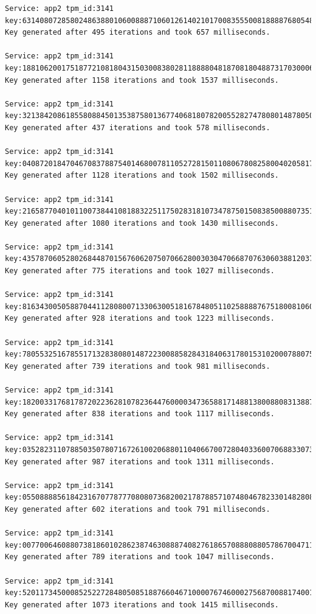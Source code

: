 \begin{lstlisting}
Service: app2 tpm_id:3141 key:631408072858024863880106008887106012614021017008355500818888768054831008
Key generated after 495 iterations and took 657 milliseconds.

Service: app2 tpm_id:3141 key:188106200175187721081804315030083802811888804818708180488731703000680486
Key generated after 1158 iterations and took 1537 milliseconds.

Service: app2 tpm_id:3141 key:321384208618558088450135387580136774068180782005528274780801487805081678
Key generated after 437 iterations and took 578 milliseconds.

Service: app2 tpm_id:3141 key:040872018470467083788754014680078110527281501108067808258004020581700676
Key generated after 1128 iterations and took 1502 milliseconds.

Service: app2 tpm_id:3141 key:216587704010110073844108188322511750283181073478750150838500880735130815
Key generated after 1080 iterations and took 1430 milliseconds.

Service: app2 tpm_id:3141 key:435787060528026844870156760620750706628003030470668707630603881203760721
Key generated after 775 iterations and took 1027 milliseconds.

Service: app2 tpm_id:3141 key:816343005058870441128080071330630051816784805110258888767518008106028167
Key generated after 928 iterations and took 1223 milliseconds.

Service: app2 tpm_id:3141 key:780553251678551713283808014872230088582843184063178015310200078807535328
Key generated after 739 iterations and took 981 milliseconds.

Service: app2 tpm_id:3141 key:182003317681787202236281078236447600003473658817148813800880831388703710
Key generated after 838 iterations and took 1117 milliseconds.

Service: app2 tpm_id:3141 key:035282311078850350780716726100206880110406670072804033600706883307330172
Key generated after 987 iterations and took 1311 milliseconds.

Service: app2 tpm_id:3141 key:055088885618423167077877708080736820021787885710748046782330148280804038
Key generated after 602 iterations and took 791 milliseconds.

Service: app2 tpm_id:3141 key:007700646088073818601028623874630888740827618657088808805786700471168025
Key generated after 789 iterations and took 1047 milliseconds.

Service: app2 tpm_id:3141 key:520117345000852522728480508518876604671000076746000275687008817400162708
Key generated after 1073 iterations and took 1415 milliseconds.


\end{lstlisting}
